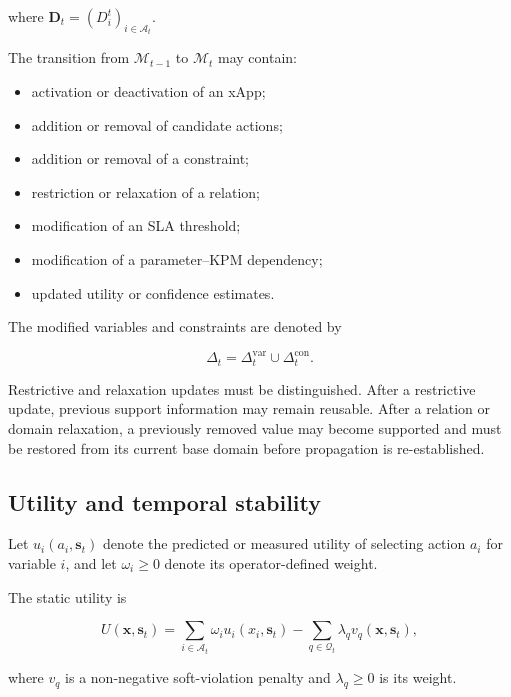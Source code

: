 \documentclass[pdflatex,sn-mathphys-num,iicol,oneside]{sn-jnl}
\begin{document}
where $\bm{D}_t=(D_i^t)_{i\in\mathcal{A}_t}$.

The transition from $\mathcal{M}_{t-1}$ to $\mathcal{M}_t$ may
contain:

\begin{itemize}
    \item activation or deactivation of an xApp;
    \item addition or removal of candidate actions;
    \item addition or removal of a constraint;
    \item restriction or relaxation of a relation;
    \item modification of an SLA threshold;
    \item modification of a parameter--KPM dependency;
    \item updated utility or confidence estimates.
\end{itemize}

The modified variables and constraints are denoted by

\begin{equation}
\Delta_t
=
\Delta_t^{\mathrm{var}}
\cup
\Delta_t^{\mathrm{con}}.
\end{equation}

Restrictive and relaxation updates must be distinguished. After a
restrictive update, previous support information may remain reusable.
After a relation or domain relaxation, a previously removed value may
become supported and must be restored from its current base domain
before propagation is re-established.

\subsection{Utility and temporal stability}

Let $u_i(a_i,\bm{s}_t)$ denote the predicted or measured utility of
selecting action $a_i$ for variable $i$, and let
$\omega_i\geq 0$ denote its operator-defined weight.

The static utility is

\begin{equation}
U(\bm{x},\bm{s}_t)
=
\sum_{i\in\mathcal{A}_t}
\omega_i u_i(x_i,\bm{s}_t)
-
\sum_{q\in\mathcal{Q}_t}
\lambda_q v_q(\bm{x},\bm{s}_t),
\label{eq:static-utility}
\end{equation}

where $v_q$ is a non-negative soft-violation penalty and
$\lambda_q\geq 0$ is its weight.
\end{document}
